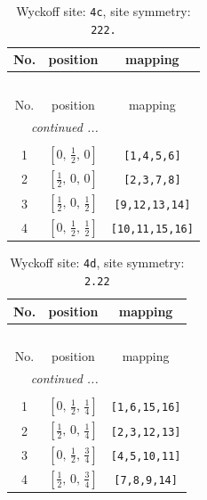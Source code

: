 \documentclass[fleqn,8pt]{jsarticle}
\begin{document}
\renewcommand{\arraystretch}{1.2}
\begin{longtable}{ccc}
\caption{Wyckoff site: {\tt 4c}, site symmetry: {\tt 222.}}
 \\
 \hline \hline
No. & position & mapping \\ \hline \endfirsthead

\multicolumn{2}{l}{\tablename\ \thetable{}} \\
 \hline \hline
No. & position & mapping \\ \hline \endhead

 \hline \hline
\multicolumn{2}{r}{\footnotesize\it continued ...} \\ \endfoot

 \hline \hline
\multicolumn{2}{r}{} \\ \endlastfoot

1 & $\left[ 0,\, \frac{1}{2},\, 0 \right]$ & {\tt [1,4,5,6]} \\ \hline
2 & $\left[ \frac{1}{2},\, 0,\, 0 \right]$ & {\tt [2,3,7,8]} \\ \hline
3 & $\left[ \frac{1}{2},\, 0,\, \frac{1}{2} \right]$ & {\tt [9,12,13,14]} \\ \hline
4 & $\left[ 0,\, \frac{1}{2},\, \frac{1}{2} \right]$ & {\tt [10,11,15,16]} \\
\end{longtable}
\renewcommand{\arraystretch}{1.2}
\begin{longtable}{ccc}
\caption{Wyckoff site: {\tt 4d}, site symmetry: {\tt 2.22}}
 \\
 \hline \hline
No. & position & mapping \\ \hline \endfirsthead

\multicolumn{2}{l}{\tablename\ \thetable{}} \\
 \hline \hline
No. & position & mapping \\ \hline \endhead

 \hline \hline
\multicolumn{2}{r}{\footnotesize\it continued ...} \\ \endfoot

 \hline \hline
\multicolumn{2}{r}{} \\ \endlastfoot

1 & $\left[ 0,\, \frac{1}{2},\, \frac{1}{4} \right]$ & {\tt [1,6,15,16]} \\ \hline
2 & $\left[ \frac{1}{2},\, 0,\, \frac{1}{4} \right]$ & {\tt [2,3,12,13]} \\ \hline
3 & $\left[ 0,\, \frac{1}{2},\, \frac{3}{4} \right]$ & {\tt [4,5,10,11]} \\ \hline
4 & $\left[ \frac{1}{2},\, 0,\, \frac{3}{4} \right]$ & {\tt [7,8,9,14]} \\
\end{longtable}
\end{document}
